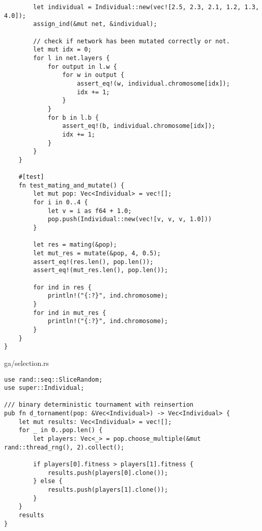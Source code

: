 \begin{code}
\begin{verbatim}
        let individual = Individual::new(vec![2.5, 2.3, 2.1, 1.2, 1.3, 4.0]);
        assign_ind(&mut net, &individual);

        // check if network has been mutated correctly or not.
        let mut idx = 0;
        for l in net.layers {
            for output in l.w {
                for w in output {
                    assert_eq!(w, individual.chromosome[idx]);
                    idx += 1;
                }
            }
            for b in l.b {
                assert_eq!(b, individual.chromosome[idx]);
                idx += 1;
            }
        }
    }

    #[test]
    fn test_mating_and_mutate() {
        let mut pop: Vec<Individual> = vec![];
        for i in 0..4 {
            let v = i as f64 + 1.0;
            pop.push(Individual::new(vec![v, v, v, 1.0]))
        }

        let res = mating(&pop);
        let mut_res = mutate(&pop, 4, 0.5);
        assert_eq!(res.len(), pop.len());
        assert_eq!(mut_res.len(), pop.len());

        for ind in res {
            println!("{:?}", ind.chromosome);
        }
        for ind in mut_res {
            println!("{:?}", ind.chromosome);
        }
    }
}

\end{verbatim}
\end{code}

\begin{code}  
\caption{ga/selection.rs}
\label{src:select}
\begin{verbatim}
use rand::seq::SliceRandom;
use super::Individual;

/// binary deterministic tournament with reinsertion
pub fn d_tornament(pop: &Vec<Individual>) -> Vec<Individual> {
    let mut results: Vec<Individual> = vec![];
    for _ in 0..pop.len() {
        let players: Vec<_> = pop.choose_multiple(&mut rand::thread_rng(), 2).collect();

        if players[0].fitness > players[1].fitness {
            results.push(players[0].clone());
        } else {
            results.push(players[1].clone());
        }
    }
    results
}

\end{verbatim}
\end{code}


